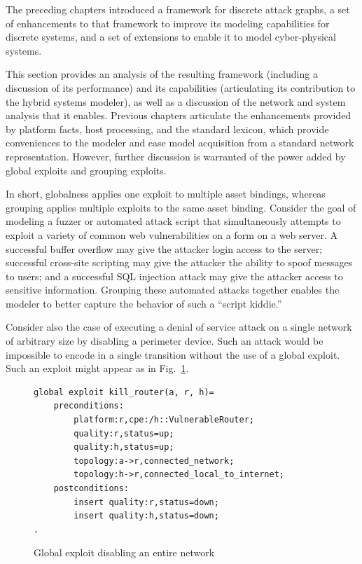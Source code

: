 The preceding chapters introduced a framework for discrete attack graphs,
a set of enhancements to that framework to improve its modeling capabilities for
discrete systems, and a set of extensions to enable it to model cyber-physical
systems.

This section provides an analysis of the resulting framework (including
a discussion of its performance) and its capabilities (articulating its
contribution to the hybrid systems modeler), as well as a discussion of the
network and system analysis that it enables.
Previous chapters articulate the enhancements provided by platform
facts, host processing, and the standard lexicon, which provide conveniences
to the modeler and ease model acquisition from a standard network 
representation. However, further discussion is warranted of the power added
by global exploits and grouping exploits.

In short, globalness applies one exploit to multiple asset 
bindings, whereas grouping applies multiple exploits to the same asset binding.
Consider the goal of modeling a fuzzer or automated attack script that
simultaneously attempts to exploit a variety of common web vulnerabilities on
a form on a web server. A successful buffer overflow may give the attacker
login access to the server; successful cross-site scripting may give the
attacker the ability to spoof messages to users; and a successful SQL injection
attack may give the attacker access to sensitive information. Grouping these
automated attacks together enables the modeler to better capture the behavior
of such a ``script kiddie.''

Consider also the case of executing a denial of service attack on a single
network of arbitrary size by disabling a perimeter device. Such an attack would
be impossible to encode in a single transition without the use of a global
exploit. Such an exploit might appear as in Fig.~\ref{fig:network_dos_global}.

\begin{figure}
\begin{lstlisting}
global exploit kill_router(a, r, h)=
    preconditions:
        platform:r,cpe:/h::VulnerableRouter;
        quality:r,status=up;
        quality:h,status=up;
        topology:a->r,connected_network;
        topology:h->r,connected_local_to_internet;
    postconditions:
        insert quality:r,status=down;
        insert quality:h,status=down;
.
\end{lstlisting}
\caption{Global exploit disabling an entire network}
\label{fig:network_dos_global}
\end{figure}

